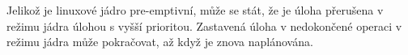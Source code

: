 \documentclass[
  field=ainfk,
  biblatex,
  glossaries,
  index
]{kidiplom}
\begin{document}
%
%
%
%
%
%
%

Jelikož je linuxové jádro pre-emptivní, může se stát, že je úloha přerušena v režimu jádra úlohou s vyšší prioritou. Zastavená úloha v nedokončené operaci v režimu jádra může pokračovat, až když je znova naplánována. 
\end{document}
